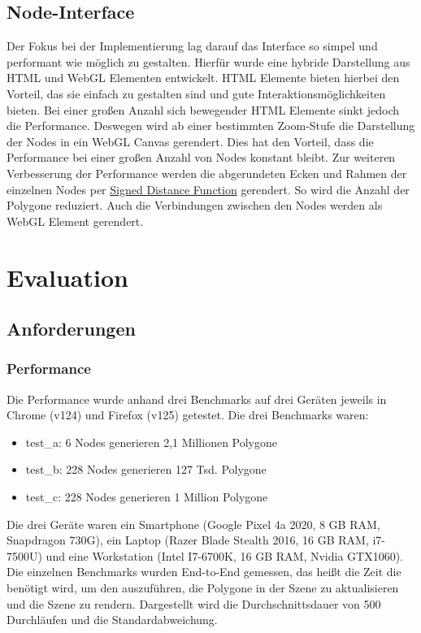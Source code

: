 \documentclass[ngerman]{article}
\begin{document}
\subsection{Node-Interface}
Der Fokus bei der Implementierung lag darauf das Interface so simpel und performant wie möglich zu gestalten. Hierfür wurde eine hybride Darstellung aus HTML und WebGL Elementen entwickelt. HTML Elemente bieten hierbei den Vorteil, das sie einfach zu gestalten sind und gute Interaktionsmöglichkeiten bieten. Bei einer großen Anzahl sich bewegender HTML Elemente sinkt jedoch die Performance. 
Deswegen wird ab einer bestimmten Zoom-Stufe die Darstellung der Nodes in ein WebGL Canvas gerendert. Dies hat den Vorteil, dass die Performance bei einer großen Anzahl von Nodes konstant bleibt. 
Zur weiteren Verbesserung der Performance werden die abgerundeten Ecken und Rahmen der einzelnen Nodes per \href{https://en.wikipedia.org/wiki/Signed_distance_function}{Signed Distance Function} gerendert. So wird die Anzahl der Polygone reduziert. Auch die Verbindungen zwischen den Nodes werden als WebGL Element gerendert.

\pagebreak


\section{Evaluation}

\subsection{Anforderungen}

\subsubsection{Performance}

Die Performance wurde anhand drei Benchmarks auf drei Geräten jeweils in Chrome (v124) und Firefox (v125) getestet. Die drei Benchmarks waren:

\begin{itemize}
  \item test\_a: 6 Nodes generieren 2,1 Millionen Polygone
  \item test\_b: 228 Nodes generieren 127 Tsd. Polygone
  \item test\_c: 228 Nodes generieren 1 Million Polygone
\end{itemize}

Die drei Geräte waren ein Smartphone (Google Pixel 4a 2020, 8 GB RAM, Snapdragon 730G), ein Laptop (Razer Blade Stealth 2016, 16 GB RAM, i7-7500U) und eine Workstation (Intel I7-6700K, 16 GB RAM, Nvidia GTX1060). 
\br
Die einzelnen Benchmarks wurden End-to-End gemessen, das heißt die Zeit die benötigt wird, um den  auszuführen, die Polygone in der Szene zu aktualisieren und die Szene zu rendern.
Dargestellt wird die Durchschnittsdauer von 500 Durchläufen und die Standardabweichung.
\end{document}
